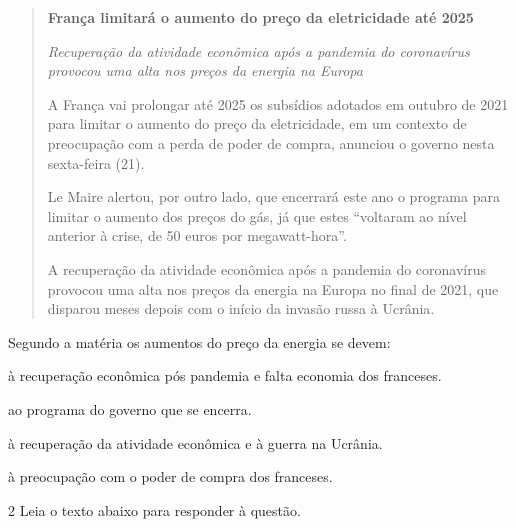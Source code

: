 \begin{quote}

\textbf{França limitará o aumento do preço da eletricidade até 2025}

\textit{Recuperação da atividade econômica após a pandemia do coronavírus
provocou uma alta nos preços da energia na Europa}

A França vai prolongar até 2025 os subsídios adotados em outubro de 2021
para limitar o aumento do preço da eletricidade, em um contexto de
preocupação com a perda de poder de compra, anunciou o governo nesta
sexta-feira (21).

Le Maire alertou, por outro lado, que encerrará este ano o programa para
limitar o aumento dos preços do gás, já que estes ``voltaram ao nível
anterior à crise, de 50 euros por megawatt-hora''.

A recuperação da atividade econômica após a pandemia do coronavírus
provocou uma alta nos preços da energia na Europa no final de 2021, que
disparou meses depois com o início da invasão russa à Ucrânia.

\end{quote}


Segundo a matéria os aumentos do preço da energia se devem:

\begin{escolha}
    
    \item à recuperação econômica pós pandemia e falta economia dos franceses.
    
    \item ao programa do governo que se encerra.
    
    \item à recuperação da atividade econômica e à guerra na Ucrânia.
    
    \item à preocupação com o poder de compra dos franceses.

\end{escolha}

\pagebreak

\num{2} Leia o texto abaixo para responder à questão. 



